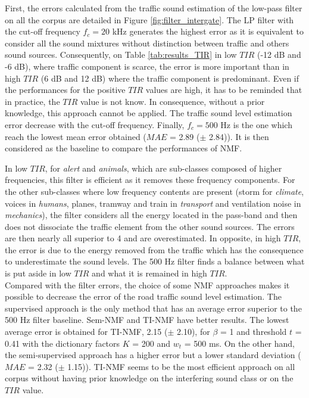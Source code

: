 \documentclass[twocolumn]{svjour3}          %
\begin{document}
First, the errors calculated from the traffic sound estimation of the low-pass filter on all the corpus are detailed in Figure \ref{fig:filter_intergate}. The LP filter with the cut-off frequency $f_c = 20 $ kHz generates the highest error as it is equivalent to consider all the sound mixtures without distinction between traffic and others sound sources. Consequently, on Table \ref{tab:results_TIR} in low $TIR$ (-12 dB and -6 dB), where traffic component is scarce, the error is more important than in high $TIR$ (6 dB and 12 dB) where the traffic component is predominant. Even if the performances for the positive $TIR$ values are high, it has to be reminded that in practice, the $TIR$ value is not know. In consequence, without a prior knowledge, this approach cannot be applied. The traffic sound level estimation error decrease with the cut-off frequency. Finally, $f_c = 500$ Hz is the one which reach the lowest mean error obtained ($MAE$ = 2.89 ($\pm$ 2.84)). It is then considered as the baseline to compare the performances of NMF.

In low $TIR$, for \textit{alert} and \textit{animals}, which are sub-classes composed of higher frequencies, this filter is efficient as it removes these frequency components. For the other sub-classes where low frequency contents are present (storm for \textit{climate}, voices in \textit{humans}, planes, tramway and train in \textit{transport} and ventilation noise in \textit{mechanics}), the filter considers all the energy located in the pass-band and then does not dissociate the traffic element from the other sound sources. The errors are then nearly all superior to 4 and are overestimated. In opposite, in high $TIR$, the error is due to the energy removed from the traffic which has the consequence to underestimate the sound levels. The 500 Hz filter finds a balance between what is put aside in low $TIR$ and what it is remained in high $TIR$. \\

Compared with the filter errors, the choice of some NMF approaches makes it possible to decrease the error of the road traffic sound level estimation. The supervised approach is the only method that has an average error superior to the 500 Hz filter baseline. Sem-NMF and TI-NMF have better results. The lowest average error is obtained for TI-NMF,  2.15 ($\pm$ 2.10), for $\beta$ = 1 and threshold $t$ = 0.41 with the dictionary factors $K$ = 200 and $w_t$ = 500 ms. On the other hand, the semi-supervised approach has a higher error but a lower standard deviation ($MAE$ = 2.32 ($\pm$ 1.15)). TI-NMF seems to be the most efficient approach on all corpus without having prior knowledge on the interfering sound class or on the $TIR$ value.
\end{document}
